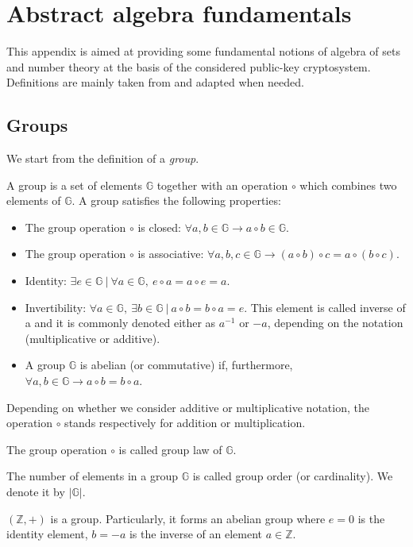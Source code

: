 \chapter{Abstract algebra fundamentals}
\label{app:A}
This appendix is aimed at providing some fundamental notions of  algebra of sets and number theory at the basis of the considered public-key cryptosystem. Definitions are mainly taken from \cite{UnderstandingCrypto} and adapted when needed.
\section{Groups}
We start from the definition of a \textit{group}.
\begin{mydef}
\label{defA1}
A group is a set of elements $\mathbb{G}$ together with an operation $\circ$ which combines two elements of $\mathbb{G}$. A group  satisfies the following properties:
	\begin{itemize}
		\item The group operation $\circ$ is closed: $\forall a, b \in \mathbb{G} \rightarrow a \circ b \in \mathbb{G}$.
		\item The group operation $\circ$ is associative: $\forall a, b, c \in \mathbb{G}  \rightarrow (a \circ b) \circ c = a \circ (b \circ c)$.
		\item Identity: $\exists e \in \mathbb{G} \ | \ \forall a \in \mathbb{G}, \ e \circ a = a \circ e = a$.
		\item Invertibility: $\forall a \in \mathbb{G}, \ \exists b \in \mathbb{G} \ | \ a \circ b = b \circ a = e$. This element is called inverse of a and it is commonly denoted either as $a^{-1}$ or $-a$, depending on the notation (multiplicative or additive).
		\item A group $\mathbb{G}$ is abelian (or commutative) if, furthermore, $\forall a, b \in \mathbb{G} \rightarrow a \circ b = b \circ a$.
	\end{itemize}
\end{mydef}
\noindent
Depending on whether we consider additive or multiplicative notation, the operation $\circ$ stands respectively for addition or multiplication.
\begin{myrem} The group operation $\circ$ is called group law of $\mathbb{G}$.
\end{myrem}
\begin{myrem} The number of elements in a group $\mathbb{G}$ is called group order (or cardinality). We denote it by $|\mathbb{G}|$.
\end{myrem}
\begin{myexample}
$(\mathbb{Z},+)$ is a group. Particularly, it forms an abelian group where $e = 0$ is the identity element, $b = -a$ is the inverse of an element $a \in \mathbb{Z}$.
\end{myexample}
